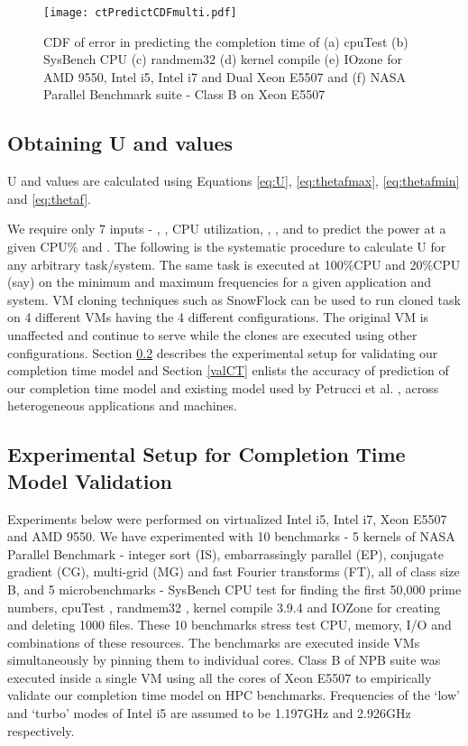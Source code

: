\documentclass{sig-alternate}
\begin{document}
\begin{figure*}
\centering
\texttt{[image: ctPredictCDFmulti.pdf]}
\caption{CDF of error in predicting the completion time of (a) cpuTest (b) SysBench CPU (c) randmem32 (d) kernel compile (e) IOzone for AMD 9550, Intel i5, Intel i7 and Dual Xeon E5507 and (f) NASA Parallel Benchmark suite - Class B on Xeon E5507}
\label{fig:ctPredictCDFmulti}
\vspace{-0.5cm}
\end{figure*}



\subsection{Obtaining U and  values}
U and  values are calculated using Equations \ref{eq:U}, \ref{eq:thetafmax}, \ref{eq:thetafmin} and \ref{eq:thetaf}. 





We require only 7 inputs - , ,  CPU utilization, , ,  and  to predict the power at a given CPU\% and . The following is the systematic procedure to calculate U for any arbitrary task/system. The same task is executed at 100\%CPU and 20\%CPU (say) on the minimum and maximum frequencies for a given application and system. VM cloning techniques such as SnowFlock \cite{SnowFlock} can be used to run cloned task on 4 different VMs having the 4 different configurations. The original VM is unaffected and continue to serve while the clones are executed using other configurations. Section \ref{expCTV} describes the experimental setup for validating our completion time model and Section \ref{valCT} enlists the accuracy of prediction of our completion time model and existing model used by Petrucci et al. \cite{Petrucci2011}, across heterogeneous applications and machines.
\subsection{Experimental Setup for Completion Time Model Validation}
\label{expCTV}

Experiments below were performed on virtualized Intel i5, Intel i7, Xeon E5507 and AMD 9550. We have experimented with 10  benchmarks - 5 kernels of NASA Parallel Benchmark \cite{nasa} - integer sort (IS), embarrassingly parallel (EP), conjugate gradient (CG), multi-grid (MG) and fast Fourier transforms (FT), all of class size B, and 5 microbenchmarks - SysBench CPU test \cite{sysbench} for finding the first 50,000 prime numbers, cpuTest \cite{cputest}, randmem32 \cite{randmem}, kernel compile 3.9.4 \cite{kc} and IOZone \cite{iozone} for creating and deleting 1000 files. These 10 benchmarks stress test CPU, memory, I/O and combinations of these resources. The benchmarks are executed inside VMs simultaneously by pinning them to individual cores. Class B of NPB suite was executed inside a single VM using all the cores of Xeon E5507 to empirically validate our completion time model on HPC benchmarks. Frequencies of the `low' and `turbo' modes of Intel i5 are assumed to be 1.197GHz and 2.926GHz respectively. 
\end{document}
